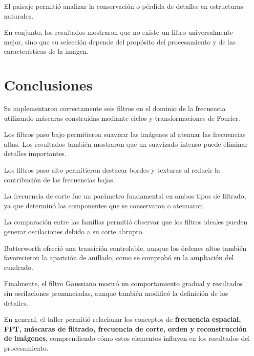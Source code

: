 \documentclass[11pt,letterpaper]{article}
\begin{document}
El paisaje permitió analizar
la conservación o pérdida de detalles
en estructuras naturales.

En conjunto, los resultados mostraron
que no existe un filtro universalmente
mejor, sino que su selección depende
del propósito del procesamiento
y de las características de la imagen.

\section{Conclusiones}

Se implementaron correctamente seis filtros
en el dominio de la frecuencia utilizando
máscaras construidas mediante ciclos
y transformaciones de Fourier.

Los filtros paso bajo permitieron suavizar
las imágenes al atenuar las frecuencias
altas. Los resultados también mostraron
que un suavizado intenso puede eliminar
detalles importantes.

Los filtros paso alto permitieron destacar
bordes y texturas al reducir la contribución
de las frecuencias bajas.

La frecuencia de corte fue un parámetro
fundamental en ambos tipos de filtrado,
ya que determinó las componentes que
se conservaron o atenuaron.

La comparación entre las familias
permitió observar que los filtros ideales
pueden generar oscilaciones debido
a su corte abrupto.

Butterworth ofreció una transición
controlable, aunque los órdenes altos
también favorecieron la aparición
de anillado, como se comprobó
en la ampliación del cuadrado.

Finalmente, el filtro Gaussiano mostró
un comportamiento gradual y resultados
sin oscilaciones pronunciadas,
aunque también modificó la definición
de los detalles.

En general, el taller permitió relacionar
los conceptos de
\textbf{frecuencia espacial, FFT,
máscaras de filtrado, frecuencia de corte,
orden y reconstrucción de imágenes},
comprendiendo cómo estos elementos
influyen en los resultados del procesamiento.
\end{document}
